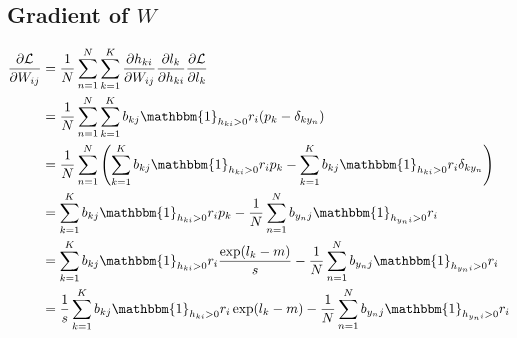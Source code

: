 \documentclass{article}
\begin{document}
\subsection*{Gradient of $W$}
\[
\begin{aligned}
\frac{\partial \mathcal{L}}{\partial W_{ij}} &= \frac{1}{N} \sum_{n=1}^{N} \sum_{k=1}^{K} \frac{\partial h_{ki}}{\partial W_{ij}} \frac{\partial l_k}{\partial h_{ki}} \frac{\partial \mathcal{L}}{\partial l_k} \\
&= \frac{1}{N} \sum_{n=1}^{N} \sum_{k=1}^{K} b_{kj} \mathbbm{1}_{h_{ki} > 0} r_i (p_k - \delta_{ky_n}) \\
&= \frac{1}{N} \sum_{n=1}^{N} \left( \sum_{k=1}^{K} b_{kj} \mathbbm{1}_{h_{ki} > 0} r_i p_k - \sum_{k=1}^{K} b_{kj} \mathbbm{1}_{h_{ki} > 0} r_i \delta_{ky_n} \right) \\
&= \sum_{k=1}^{K} b_{kj} \mathbbm{1}_{h_{ki} > 0} r_i p_k - \frac{1}{N} \sum_{n=1}^{N} b_{y_nj} \mathbbm{1}_{h_{y_ni} > 0} r_i \\
&= \sum_{k=1}^{K} b_{kj} \mathbbm{1}_{h_{ki} > 0} r_i \frac{\exp(l_k - m)}{s} - \frac{1}{N} \sum_{n=1}^{N} b_{y_nj} \mathbbm{1}_{h_{y_ni} > 0} r_i \\
&= \frac{1}{s} \sum_{k=1}^{K} b_{kj} \mathbbm{1}_{h_{ki} > 0} r_i \exp(l_k - m) - \frac{1}{N} \sum_{n=1}^{N} b_{y_nj} \mathbbm{1}_{h_{y_ni} > 0} r_i \\
\end{aligned}
\]
\end{document}

